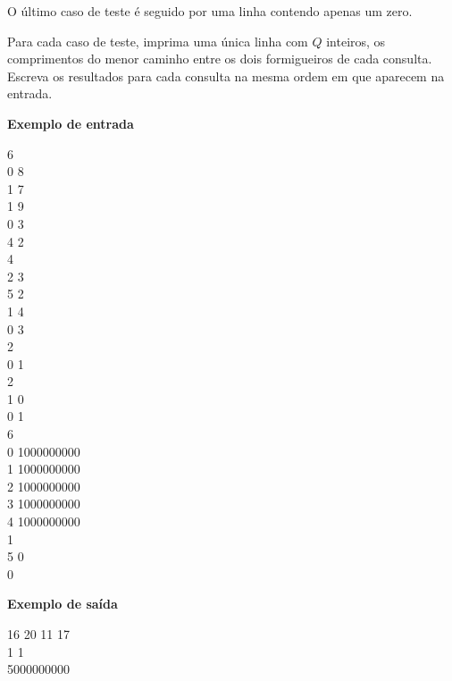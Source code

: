 {\begin{mdframed}[backgroundcolor=blue!5]
O último caso de teste é seguido por uma linha contendo apenas um zero.

\vspace{0.2cm}

Para cada caso de teste, imprima uma única linha com $Q$ inteiros, os comprimentos do menor caminho entre os dois formigueiros de cada consulta. Escreva os resultados para cada consulta na mesma ordem em que aparecem na entrada.

\vspace{0.75cm}

\begin{minipage}{.4\linewidth}
    {\large{\textbf{Exemplo de entrada}}}\vspace{0.2cm}
    \begin{mdframed}[backgroundcolor=gray!10]
        \vspace{-0.5cm}
        6\\
        0 8\\
        1 7\\
        1 9\\
        0 3\\
        4 2\\
        4\\
        2 3\\
        5 2\\
        1 4\\
        0 3\\
        2\\
        0 1\\
        2\\
        1 0\\
        0 1\\
        6 \\
        0 1000000000\\
        1 1000000000\\
        2 1000000000\\
        3 1000000000\\
        4 1000000000\\
        1\\
        5 0\\
        0
        \vspace{-0.4cm}
    \end{mdframed}
\end{minipage}
\hspace{2cm}
\begin{minipage}{.4\linewidth}
    \vspace{-11.25cm}
    {\large{\textbf{Exemplo de saída}}}\vspace{0.2cm}
    \begin{mdframed}[backgroundcolor=gray!10]
        \vspace{-0.5cm}
        16 20 11 17\\
        1 1\\
        5000000000
        \vspace{-0.4cm}
    \end{mdframed}
\end{minipage}%


\end{mdframed}}

